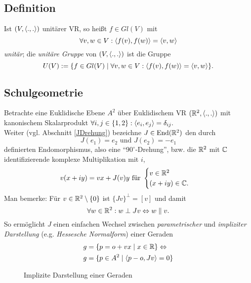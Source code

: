 \subsection{Definition}
\begin{Definition}
	Ist $ (V,\langle .,. \rangle) $ unitärer VR, so heißt $ f\in Gl(V) $ mit
		\[ \forall v,w\in V: \langle f(v),f(w) \rangle = \langle v,w \rangle \]
	\emph{unitär}; die \emph{unitäre Gruppe} von $ (V,\langle .,. \rangle) $ ist die Gruppe
		\[ U(V) := \{f\in Gl(V)\mid \forall v,w\in V: \langle f(v),f(w) \rangle = \langle v,w \rangle \}. \]
\end{Definition}


\subsection{Schulgeometrie}
	Betrachte eine Euklidische Ebene $ A^2 $ über Euklidischem VR $ (\mathbb{R}^2,\langle .,. \rangle) $ mit kanonischem Skalarprodukt $ \forall i,j\in \{1,2\}:\langle e_i,e_j \rangle = \delta_{ij}. $\\
	Weiter (vgl. Abschnitt \ref{JDrehung}) bezeichne $ J\in \operatorname{End}(\mathbb{R}^2) $ den durch
		\[ J(e_1) = e_2 \text{ und } J(e_2) = -e_1 \]
	definierten Endomorphismus, also eine "`$ 90^{\circ}$-Drehung"',
	bzw. die $ \mathbb{R}^2 $ mit $ \mathbb{C} $ identifizierende komplexe Multiplikation mit $ i $,
		\[ v(x+iy) = vx+J(v)y \text{ für }
		\begin{cases}
			v\in \mathbb{R}^2\\ (x+iy)\in \mathbb{C}.
		\end{cases} \]
	Man bemerke: Für $ v\in \mathbb{R}^2\setminus \{0\} $ ist $ \{Jv\}^\perp = [v] $ und damit
		\[ \forall w\in \mathbb{R}^2: w\perp Jv \Leftrightarrow w\parallel v. \]
    So ermöglicht $ J $ einen einfachen Wechsel zwischen \emph{parametrischer} und \emph{impliziter Darstellung} (e.g. \emph{Hessesche Normalform}) einer Geraden
   		\begin{align*}
		    g &= \{p = o + vx\mid x\in \mathbb{R}\} \Leftrightarrow \\
		    g &= \{p\in A^2\mid \langle p-o,Jv \rangle = 0\} 
		\end{align*} 

     	\begin{figure}[h]\centering
     		
     		\caption{Implizite Darstellung einer Geraden}
    	\end{figure}

